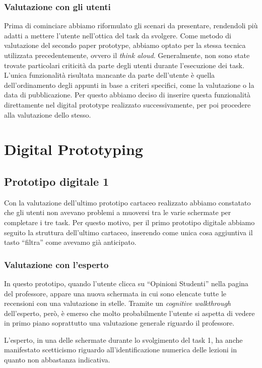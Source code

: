 \subsubsection{Valutazione con gli utenti}
Prima di cominciare abbiamo riformulato gli scenari da presentare, rendendoli più adatti a mettere l'utente nell'ottica del task da svolgere.
Come metodo di valutazione del secondo paper prototype, abbiamo optato per la stessa tecnica utilizzata precedentemente, ovvero il \textit{think aloud}. Generalmente, non
sono state trovate particolari criticità da parte degli utenti durante l’esecuzione dei task. L’unica funzionalità risultata mancante da parte dell’utente è quella
dell’ordinamento degli appunti in base a criteri specifici, come la valutazione o la data di pubblicazione. Per questo
abbiamo deciso di inserire questa funzionalità direttamente nel digital prototype realizzato successivamente, per poi procedere alla valutazione dello stesso.

\section{Digital Prototyping}

\subsection{Prototipo digitale 1}
Con la valutazione dell'ultimo prototipo cartaceo realizzato abbiamo constatato che gli utenti non avevano problemi a muoversi tra le varie schermate per completare i tre task. Per questo motivo, per il
primo prototipo digitale abbiamo seguito la struttura dell’ultimo cartaceo, inserendo come unica cosa aggiuntiva il tasto “filtra” come avevamo già anticipato.

\subsubsection{Valutazione con l'esperto}
In questo prototipo, quando l’utente clicca su “Opinioni Studenti” nella pagina del professore, appare una nuova schermata in cui sono elencate tutte le recensioni con una valutazione in stelle.
Tramite un \textit{cognitive walkthrough} dell’esperto, però, è emerso che molto probabilmente l’utente si aspetta di vedere in primo piano soprattutto una valutazione generale riguardo il professore.

L’esperto, in una delle schermate durante lo svolgimento del task 1, ha anche manifestato scetticismo riguardo all’identificazione numerica delle lezioni in quanto non abbastanza indicativa.

